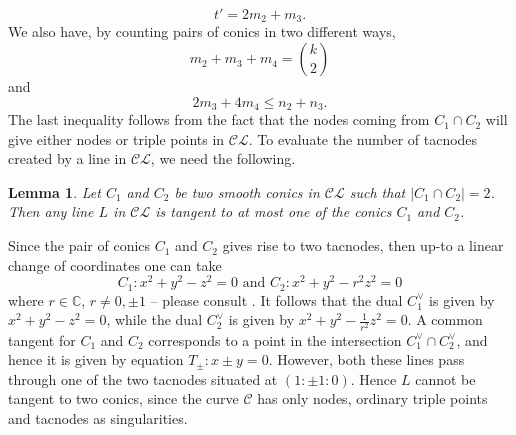 \documentclass[12pt]{amsart}
\theoremstyle{plain}
\newtheorem{lem}[subsection]{Lemma}
\theoremstyle{definition}
\numberwithin{equation}{section}
\newcommand{\CC}{{\mathcal C}}
\newcommand{\C}{\mathbb{C}}
\begin{document}
\begin{equation}
\label{E16a}
t'=2m_2+m_3.
\end{equation}
We also have, by counting pairs of conics in two different ways,
\begin{equation}
\label{E16b}
m_2+m_3+m_4=\binom{k}{2}
\end{equation}
and 
\begin{equation}
\label{E16c}
2m_3+4m_4\leq n_2+n_3.
\end{equation}
The last inequality follows from the fact that the nodes coming from $C_1 \cap C_2$ will give either nodes or triple points in $\mathcal{CL}$. To evaluate the number of tacnodes created by a line in $\mathcal{CL}$, we need the following.
\begin{lem}
\label{lem16}
Let $C_1$ and $C_2$ be two smooth conics in $\mathcal{CL}$ such that 
$|C_1 \cap C_2|=2$. Then any line $L$ in $\mathcal{CL}$ is tangent to at most one of the conics $C_1$ and $C_2$.
\end{lem}
\proof
Since the pair of conics $C_1$ and $C_2$ gives rise to two tacnodes, then up-to a linear change of coordinates one can take
$$C_1:x^2+y^2-z^2=0 \text{ and } C_2: x^2+y^2-r^2z^2=0$$
where $r \in \C$, $r \ne 0, \pm 1$ -- please consult \cite[Proposition 3]{Meg}.
It follows that the dual $C_1^{\vee}$ is given by $x^2+y^2-z^2=0$, while the dual  $C_2^{\vee}$ is given by $x^2+y^2-\frac{1}{r^{2}}z^2=0$.
A common tangent for $C_1$ and $C_2$ corresponds to a point in the
intersection $C_1^{\vee} \cap C_2^{\vee}$, and hence it is given by equation $T_{\pm}: x\pm y=0$. However, both these lines pass through one of the two tacnodes situated at $(1:\pm 1:0)$. Hence $L$ cannot be tangent to two conics, since the curve $\CC$ has only  nodes, ordinary triple points and tacnodes as singularities.
\endproof
\end{document}
